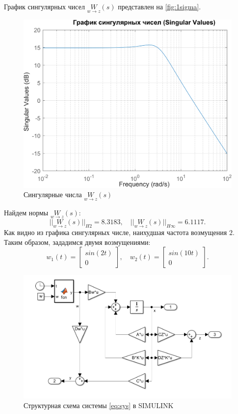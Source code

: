 График сингулярных чисел $\underset{w\rightarrow z}{W}(s)$ представлен на \autoref{fig:1sigma}.
\begin{figure}[H]
    \centering
    \includegraphics[width=0.8\linewidth]{figs/1_sigma.png}
    \caption{Сингулярные числа $\underset{w\rightarrow z}{W}(s)$}
    \label{fig:1sigma}
\end{figure}
\noindent Найдем нормы $\underset{w\rightarrow z}{W}(s)$:
\begin{equation*}
    ||\underset{w\rightarrow z}{W}(s)||_{H2}=8.3183,\quad
    ||\underset{w\rightarrow z}{W}(s)||_{H\infty}=6.1117.
\end{equation*}
Как видно из графика сингулярных числе, наихудшая частота возмущения $2$.
Таким образом, зададимся двумя возмущениями:
\begin{equation*}
    w_1(t)=\begin{bmatrix}
        sin(2t)\\
        0
    \end{bmatrix},\quad
    w_2(t)=\begin{bmatrix}
        sin(10t)\\
        0
    \end{bmatrix}.
\end{equation*}
\begin{figure}[H]
    \centering
    \includegraphics[width=1\linewidth]{figs/1_slx.png}
    \caption{Структурная схема системы \eqref{eq:sys} в SIMULINK}
    \label{fig:slx}
\end{figure}

